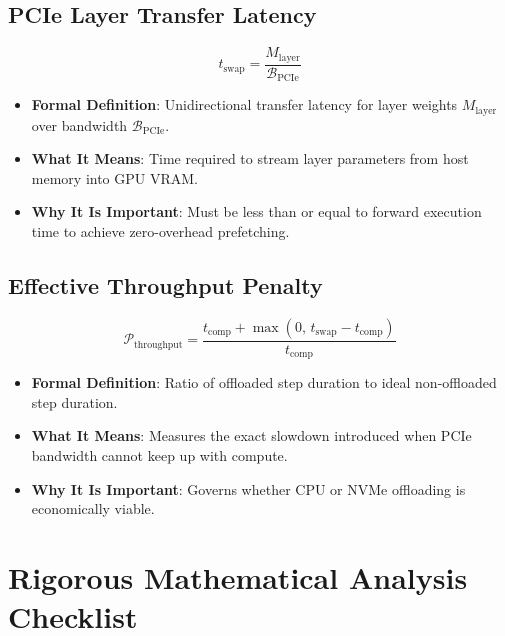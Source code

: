 \documentclass[11pt,a4paper]{article}
\theoremstyle{definition}
\begin{document}
\subsection{PCIe Layer Transfer Latency}
{\boldmath
\begin{equation}
t_{\text{swap}} = \frac{M_{\text{layer}}}{\mathcal{B}_{\text{PCIe}}}
\end{equation}
}
\begin{itemize}
    \item \textbf{Formal Definition}: Unidirectional transfer latency for layer weights $M_{\text{layer}}$ over bandwidth $\mathcal{B}_{\text{PCIe}}$.
    \item \textbf{What It Means}: Time required to stream layer parameters from host memory into GPU VRAM.
    \item \textbf{Why It Is Important}: Must be less than or equal to forward execution time to achieve zero-overhead prefetching.
\end{itemize}

\subsection{Effective Throughput Penalty}
{\boldmath
\begin{equation}
\mathcal{P}_{\text{throughput}} = \frac{t_{\text{comp}} + \max(0, \, t_{\text{swap}} - t_{\text{comp}})}{t_{\text{comp}}}
\end{equation}
}
\begin{itemize}
    \item \textbf{Formal Definition}: Ratio of offloaded step duration to ideal non-offloaded step duration.
    \item \textbf{What It Means}: Measures the exact slowdown introduced when PCIe bandwidth cannot keep up with compute.
    \item \textbf{Why It Is Important}: Governs whether CPU or NVMe offloading is economically viable.
\end{itemize}

\section{Rigorous Mathematical Analysis Checklist}
\end{document}
